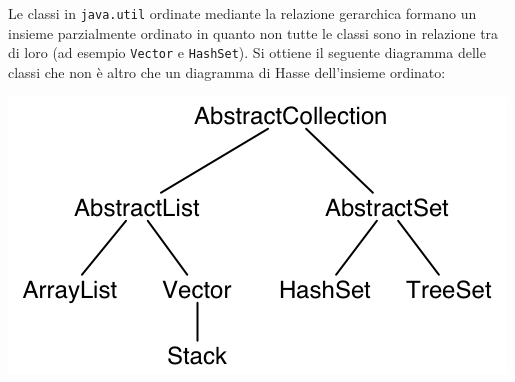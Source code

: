 \begin{example}
	Le classi in \texttt{java.util} ordinate mediante la relazione gerarchica formano un insieme parzialmente ordinato in quanto non tutte le classi sono in relazione tra di loro (ad esempio \texttt{Vector} e \texttt{HashSet}). Si ottiene il seguente diagramma delle classi che non è altro che un diagramma di Hasse dell'insieme ordinato:
	\begin{center}
		\includegraphics[scale=.35]{res/pojavautil.png}
	\end{center}
\end{example}
